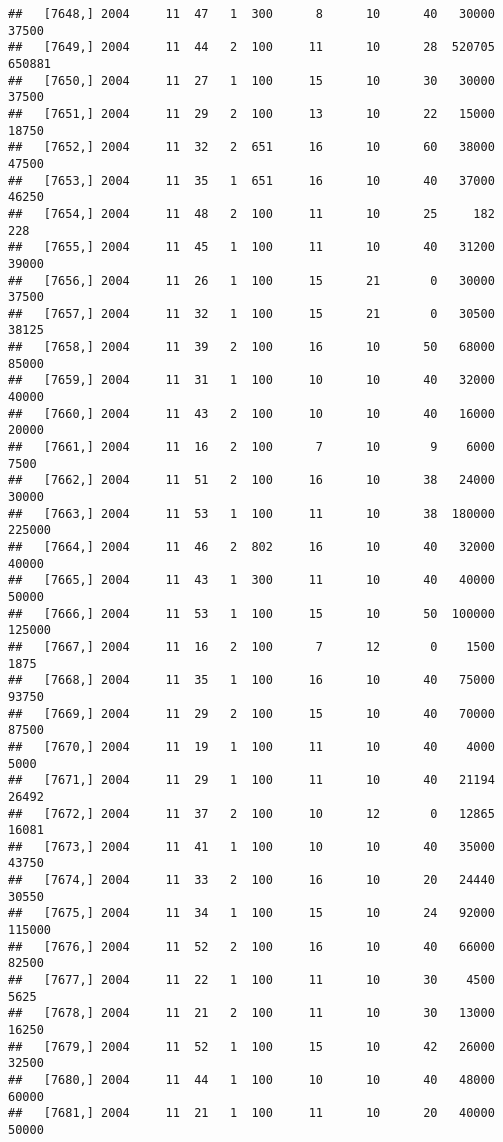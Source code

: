 \documentclass{article}\usepackage[]{graphicx}\usepackage[]{color}
\makeatletter
\newenvironment{kframe}{%
 \def\at@end@of@kframe{}%
 \ifinner\ifhmode%
  \def\at@end@of@kframe{\end{minipage}}%
  \begin{minipage}{\columnwidth}%
 \fi\fi%
 \def\FrameCommand##1{\hskip\@totalleftmargin \hskip-\fboxsep
 \colorbox{shadecolor}{##1}\hskip-\fboxsep
     \hskip-\linewidth \hskip-\@totalleftmargin \hskip\columnwidth}%
 \MakeFramed {\advance\hsize-\width
   \@totalleftmargin\z@ \linewidth\hsize
   \@setminipage}}%
 {\par\unskip\endMakeFramed%
 \at@end@of@kframe}
\newenvironment{knitrout}{}{} %
\makeatother
\begin{document}
\begin{knitrout}
\begin{kframe}
\begin{verbatim}
##   [7648,] 2004     11  47   1  300      8      10      40   30000   37500
##   [7649,] 2004     11  44   2  100     11      10      28  520705  650881
##   [7650,] 2004     11  27   1  100     15      10      30   30000   37500
##   [7651,] 2004     11  29   2  100     13      10      22   15000   18750
##   [7652,] 2004     11  32   2  651     16      10      60   38000   47500
##   [7653,] 2004     11  35   1  651     16      10      40   37000   46250
##   [7654,] 2004     11  48   2  100     11      10      25     182     228
##   [7655,] 2004     11  45   1  100     11      10      40   31200   39000
##   [7656,] 2004     11  26   1  100     15      21       0   30000   37500
##   [7657,] 2004     11  32   1  100     15      21       0   30500   38125
##   [7658,] 2004     11  39   2  100     16      10      50   68000   85000
##   [7659,] 2004     11  31   1  100     10      10      40   32000   40000
##   [7660,] 2004     11  43   2  100     10      10      40   16000   20000
##   [7661,] 2004     11  16   2  100      7      10       9    6000    7500
##   [7662,] 2004     11  51   2  100     16      10      38   24000   30000
##   [7663,] 2004     11  53   1  100     11      10      38  180000  225000
##   [7664,] 2004     11  46   2  802     16      10      40   32000   40000
##   [7665,] 2004     11  43   1  300     11      10      40   40000   50000
##   [7666,] 2004     11  53   1  100     15      10      50  100000  125000
##   [7667,] 2004     11  16   2  100      7      12       0    1500    1875
##   [7668,] 2004     11  35   1  100     16      10      40   75000   93750
##   [7669,] 2004     11  29   2  100     15      10      40   70000   87500
##   [7670,] 2004     11  19   1  100     11      10      40    4000    5000
##   [7671,] 2004     11  29   1  100     11      10      40   21194   26492
##   [7672,] 2004     11  37   2  100     10      12       0   12865   16081
##   [7673,] 2004     11  41   1  100     10      10      40   35000   43750
##   [7674,] 2004     11  33   2  100     16      10      20   24440   30550
##   [7675,] 2004     11  34   1  100     15      10      24   92000  115000
##   [7676,] 2004     11  52   2  100     16      10      40   66000   82500
##   [7677,] 2004     11  22   1  100     11      10      30    4500    5625
##   [7678,] 2004     11  21   2  100     11      10      30   13000   16250
##   [7679,] 2004     11  52   1  100     15      10      42   26000   32500
##   [7680,] 2004     11  44   1  100     10      10      40   48000   60000
##   [7681,] 2004     11  21   1  100     11      10      20   40000   50000

\end{verbatim}
\end{kframe}
\end{knitrout}
\end{document}
